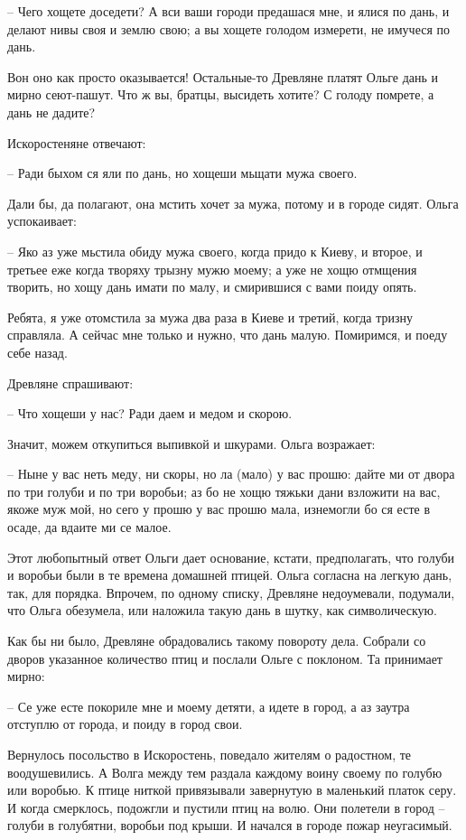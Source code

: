  – Чего хощете доседети? А вси ваши городи предашася мне, и ялися по дань, и делают нивы своя и землю свою; а вы хощете голодом измерети, не имучеся по дань.

Вон оно как просто оказывается! Остальные-то Древляне платят Ольге дань и мирно сеют-пашут. Что ж вы, братцы, высидеть хотите? С голоду помрете, а дань не дадите?

Искоростеняне отвечают:

 – Ради быхом ся яли по дань, но хощеши мьщати мужа своего.

Дали бы, да полагают, она мстить хочет за мужа, потому и в городе сидят. Ольга успокаивает:

 – Яко аз уже мьстила обиду мужа своего, когда придо к Киеву, и второе, и третьее еже когда творяху трызну мужю моему; а уже не хощю отмщения творить, но хощу дань имати по малу, и смирившися с вами поиду опять.

Ребята, я уже отомстила за мужа два раза в Киеве и третий, когда тризну справляла. А сейчас мне только и нужно, что дань малую. Помиримся, и поеду себе назад.
 
Древляне спрашивают:

 – Что хощеши у нас? Ради даем и медом и скорою.

Значит, можем откупиться выпивкой и шкурами. Ольга возражает:

 – Ныне у вас неть меду, ни скоры, но ла (мало) у вас прошю: дайте ми от двора по три голуби и по три воробьи; аз бо не хощю тяжьки дани взложити на вас, якоже муж мой, но сего у прошю у вас прошю мала, изнемогли бо ся есте в осаде, да вдаите ми се малое.

Этот любопытный ответ Ольги дает основание, кстати, предполагать, что голуби и воробьи были в те времена домашней птицей. Ольга согласна на легкую дань, так, для порядка. Впрочем, по одному списку, Древляне недоумевали, подумали, что Ольга  обезумела, или наложила такую дань в шутку, как символическую.

Как бы ни было, Древляне обрадовались такому повороту дела. Собрали со дворов указанное количество птиц и послали Ольге с поклоном. Та принимает мирно:

 – Се уже есте покориле мне и моему детяти, а идете в город, а аз заутра отступлю от города, и поиду в город свои.

Вернулось посольство в Искоростень, поведало жителям о радостном, те воодушевились. А Волга между тем раздала каждому воину своему по голубю или воробью. К птице ниткой привязывали завернутую в маленький платок серу. И когда смерклось, подожгли и пустили птиц на волю. Они полетели в город – голуби в голубятни, воробьи под крыши. И начался в городе пожар неугасимый.

